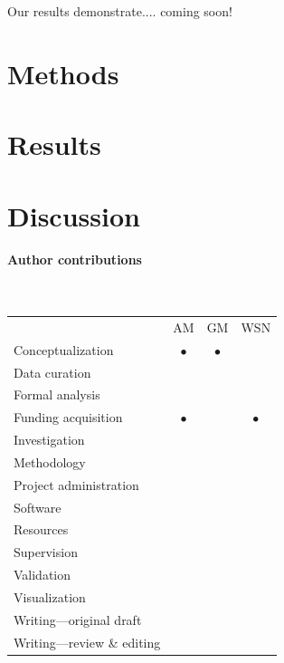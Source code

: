 \documentclass{article}
\begin{document}
Our results demonstrate.... coming soon!

\section{Methods}

\section{Results}

\section{Discussion}




\paragraph{Author contributions}~

\newcommand{\dt}{$\bullet$}


\begin{scriptsize}
\begin{tabular}{lccc}
  & AM & GM & WSN \\
Conceptualization & \dt & \dt & \\
Data curation \\
Formal analysis \\
Funding acquisition & \dt & & \dt \\
Investigation \\
Methodology \\
Project administration \\
Software \\
Resources \\
Supervision \\
Validation \\
Visualization \\
Writing---original draft \\
Writing---review \& editing \\
\end{tabular}
\end{scriptsize}



\end{document}

